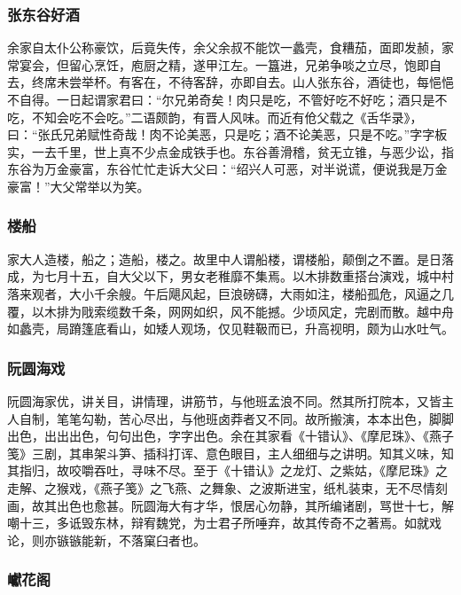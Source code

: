 \documentclass[]{article}
\begin{document}
\hypertarget{header-n611}{%
\subsubsection{张东谷好酒}\label{header-n611}}

余家自太仆公称豪饮，后竟失传，余父余叔不能饮一蠡壳，食糟茄，面即发赪，家常宴会，但留心烹饪，庖厨之精，遂甲江左。一簋进，兄弟争啖之立尽，饱即自去，终席未尝举杯。有客在，不待客辞，亦即自去。山人张东谷，酒徒也，每悒悒不自得。一日起谓家君曰：``尔兄弟奇矣！肉只是吃，不管好吃不好吃；酒只是不吃，不知会吃不会吃。''二语颇韵，有晋人风味。而近有伧父载之《舌华录》，曰：``张氏兄弟赋性奇哉！肉不论美恶，只是吃；酒不论美恶，只是不吃。''字字板实，一去千里，世上真不少点金成铁手也。东谷善滑稽，贫无立锥，与恶少讼，指东谷为万金豪富，东谷忙忙走诉大父曰：``绍兴人可恶，对半说谎，便说我是万金豪富！''大父常举以为笑。

\hypertarget{header-n616}{%
\subsubsection{楼船}\label{header-n616}}

家大人造楼，船之；造船，楼之。故里中人谓船楼，谓楼船，颠倒之不置。是日落成，为七月十五，自大父以下，男女老稚靡不集焉。以木排数重搭台演戏，城中村落来观者，大小千余艘。午后飓风起，巨浪磅礴，大雨如注，楼船孤危，风逼之几覆，以木排为戙索缆数千条，网网如织，风不能撼。少顷风定，完剧而散。越中舟如蠡壳，局蹐篷底看山，如矮人观场，仅见鞋靸而已，升高视明，颇为山水吐气。

\hypertarget{header-n621}{%
\subsubsection{阮圆海戏}\label{header-n621}}

阮圆海家优，讲关目，讲情理，讲筋节，与他班孟浪不同。然其所打院本，又皆主人自制，笔笔勾勒，苦心尽出，与他班卤莽者又不同。故所搬演，本本出色，脚脚出色，出出出色，句句出色，字字出色。余在其家看《十错认》、《摩尼珠》、《燕子笺》三剧，其串架斗笋、插科打诨、意色眼目，主人细细与之讲明。知其义味，知其指归，故咬嚼吞吐，寻味不尽。至于《十错认》之龙灯、之紫姑，《摩尼珠》之走解、之猴戏，《燕子笺》之飞燕、之舞象、之波斯进宝，纸札装束，无不尽情刻画，故其出色也愈甚。阮圆海大有才华，恨居心勿静，其所编诸剧，骂世十七，解嘲十三，多诋毁东林，辩宥魏党，为士君子所唾弃，故其传奇不之著焉。如就戏论，则亦镞镞能新，不落窠臼者也。

\hypertarget{header-n626}{%
\subsubsection{巘花阁}\label{header-n626}}
\end{document}

